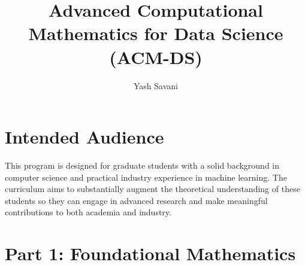 \documentclass[12pt]{article}
\title{Advanced Computational Mathematics for Data Science (ACM-DS)}
\author{Yash Savani}
\begin{document}
\maketitle

\section*{Intended Audience}
This program is designed for graduate students with a solid background in computer science and practical industry experience in machine learning. The curriculum aims to substantially augment the theoretical understanding of these students so they can engage in advanced research and make meaningful contributions to both academia and industry.

\section*{Part 1: Foundational Mathematics}
\end{document}
